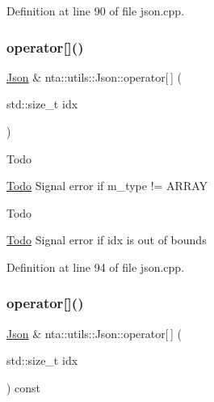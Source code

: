 Definition at line 90 of file json.\+cpp.

\mbox{\label{classnta_1_1utils_1_1Json_a236b5885612b74c21fbad169b21eaf55}} 
\subsubsection{\texorpdfstring{operator[]()}{operator[]()}\hspace{0.1cm}{\footnotesize\ttfamily [3/4]}}
{\footnotesize\ttfamily \hyperlink{classnta_1_1utils_1_1Json}{Json} \& nta\+::utils\+::\+Json\+::operator\mbox{[}$\,$\mbox{]} (\begin{DoxyParamCaption}\item[{std\+::size\+\_\+t}]{idx }\end{DoxyParamCaption})}

\begin{DoxyRefDesc}{Todo}
\item[\hyperlink{todo__todo000020}{Todo}]Signal error if m\+\_\+type != A\+R\+R\+AY \end{DoxyRefDesc}
\begin{DoxyRefDesc}{Todo}
\item[\hyperlink{todo__todo000021}{Todo}]Signal error if idx is out of bounds \end{DoxyRefDesc}


Definition at line 94 of file json.\+cpp.

\mbox{\label{classnta_1_1utils_1_1Json_a893f191111e604995488d147aaa711f8}} 
\subsubsection{\texorpdfstring{operator[]()}{operator[]()}\hspace{0.1cm}{\footnotesize\ttfamily [4/4]}}
{\footnotesize\ttfamily \hyperlink{classnta_1_1utils_1_1Json}{Json} \& nta\+::utils\+::\+Json\+::operator\mbox{[}$\,$\mbox{]} (\begin{DoxyParamCaption}\item[{std\+::size\+\_\+t}]{idx }\end{DoxyParamCaption}) const}

